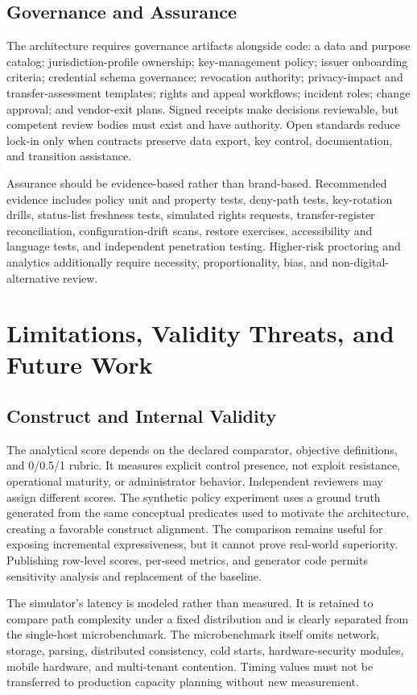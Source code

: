 \documentclass[journal]{IEEEtran}
\begin{document}
\subsection{Governance and Assurance}
The architecture requires governance artifacts alongside code: a data and purpose catalog; jurisdiction-profile ownership; key-management policy; issuer onboarding criteria; credential schema governance; revocation authority; privacy-impact and transfer-assessment templates; rights and appeal workflows; incident roles; change approval; and vendor-exit plans. Signed receipts make decisions reviewable, but competent review bodies must exist and have authority. Open standards reduce lock-in only when contracts preserve data export, key control, documentation, and transition assistance.

Assurance should be evidence-based rather than brand-based. Recommended evidence includes policy unit and property tests, deny-path tests, key-rotation drills, status-list freshness tests, simulated rights requests, transfer-register reconciliation, configuration-drift scans, restore exercises, accessibility and language tests, and independent penetration testing. Higher-risk proctoring and analytics additionally require necessity, proportionality, bias, and non-digital-alternative review.

\section{Limitations, Validity Threats, and Future Work}
\subsection{Construct and Internal Validity}
The analytical score depends on the declared comparator, objective definitions, and 0/0.5/1 rubric. It measures explicit control presence, not exploit resistance, operational maturity, or administrator behavior. Independent reviewers may assign different scores. The synthetic policy experiment uses a ground truth generated from the same conceptual predicates used to motivate the architecture, creating a favorable construct alignment. The comparison remains useful for exposing incremental expressiveness, but it cannot prove real-world superiority. Publishing row-level scores, per-seed metrics, and generator code permits sensitivity analysis and replacement of the baseline.

The simulator's latency is modeled rather than measured. It is retained to compare path complexity under a fixed distribution and is clearly separated from the single-host microbenchmark. The microbenchmark itself omits network, storage, parsing, distributed consistency, cold starts, hardware-security modules, mobile hardware, and multi-tenant contention. Timing values must not be transferred to production capacity planning without new measurement.
\end{document}
